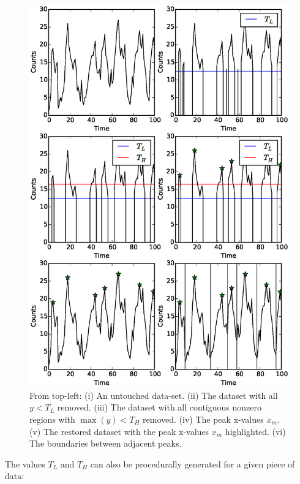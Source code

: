 \begin{figure}
    \includegraphics[width=\columnwidth, trim = 0mm 30mm 0mm 28mm]{images/steps.eps}
    \captionsetup{singlelinecheck=off}
    \caption{From top-left: (i) An untouched data-set.  (ii) The dataset with all $y<T_L$ removed.  (iii) The dataset with all contiguous nonzero regions with $\max(y)<T_H$ removed.  (iv) The peak x-values $x_m$.  (v) The restored dataset with the peak x-values $x_m$ highlighted.  (vi) The boundaries between adjacent peaks.}
   \label{fig:BurstAlg}
\end{figure}

The values $T_L$ and $T_H$ can also be procedurally generated for a given piece of data:

